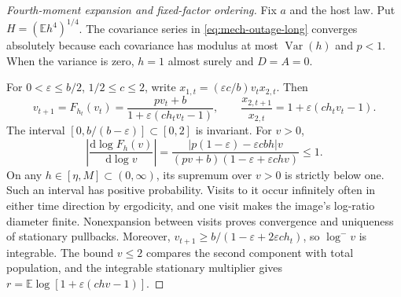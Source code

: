 \begin{proof}[Fourth-moment expansion and fixed-factor ordering]
Fix \(a\) and the host law. Put \(H=(\mathbb E h^4)^{1/4}\). The covariance series in \eqref{eq:mech-outage-long} converges absolutely because each covariance has modulus at most \(\operatorname{Var}(h)\) and \(p<1\). When the variance is zero, \(h=1\) almost surely and \(D=A=0\).

For \(0<\varepsilon\leq b/2\), \(1/2\leq c\leq2\), write \(x_{1,t}=(\varepsilon c/b)v_t x_{2,t}\). Then
\begin{equation}\label{eq:mech-outage-ratio}
 v_{t+1}=F_{h_t}(v_t)=\frac{pv_t+b}{1+\varepsilon(ch_tv_t-1)},\qquad
 \frac{x_{2,t+1}}{x_{2,t}}=1+\varepsilon(ch_tv_t-1).
\end{equation}
The interval \([0,b/(b-\varepsilon)]\subset[0,2]\) is invariant. For \(v>0\),
\begin{equation}\label{eq:mech-outage-contraction}
 \left|\frac{\mathrm d\log F_h(v)}{\mathrm d\log v}\right|
 =\frac{|p(1-\varepsilon)-\varepsilon cbh|v}
 {(pv+b)(1-\varepsilon+\varepsilon chv)}\leq1.
\end{equation}
On any \(h\in[\eta,M]\subset(0,\infty)\), its supremum over \(v>0\) is strictly below one. Such an interval has positive probability. Visits to it occur infinitely often in either time direction by ergodicity, and one visit makes the image's log-ratio diameter finite. Nonexpansion between visits proves convergence and uniqueness of stationary pullbacks. Moreover,
\(v_{t+1}\geq b/(1-\varepsilon+2\varepsilon ch_t)\), so \(\log^-v\) is integrable. The bound \(v\leq2\) compares the second component with total population, and the integrable stationary multiplier gives
\(r=\mathbb E\log[1+\varepsilon(chv-1)]\).


\end{proof}

